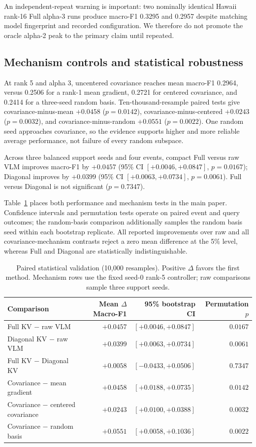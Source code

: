 \documentclass[conference]{IEEEtran}
\begin{document}
An independent-repeat warning is important: two nominally identical Hawaii
rank-16 Full alpha-3 runs produce macro-F1 0.3295 and 0.2957 despite matching
model fingerprint and recorded configuration. We therefore do not promote the
oracle alpha-2 peak to the primary claim until repeated.

\subsection{Mechanism controls and statistical robustness}
At rank 5 and alpha 3, uncentered covariance reaches mean macro-F1 0.2964,
versus 0.2506 for a rank-1 mean gradient, 0.2721 for centered covariance, and
0.2414 for a three-seed random basis. Ten-thousand-resample paired tests give
covariance-minus-mean $+0.0458$ ($p=0.0142$), covariance-minus-centered
$+0.0243$ ($p=0.0032$), and covariance-minus-random $+0.0551$ ($p=0.0022$).
One random seed approaches covariance, so the evidence supports higher and
more reliable average performance, not failure of every random subspace.

Across three balanced support seeds and four events, compact Full versus raw
VLM improves macro-F1 by $+0.0457$ (95\% CI $[+0.0046,+0.0847]$,
$p=0.0167$); Diagonal improves by $+0.0399$ (95\% CI
$[+0.0063,+0.0734]$, $p=0.0061$). Full versus Diagonal is not significant
($p=0.7347$).

Table~\ref{tab:significance} places both performance and mechanism tests in the
main paper. Confidence intervals and permutation tests operate on paired event
and query outcomes; the random-basis comparison additionally samples the random
basis seed within each bootstrap replicate. All reported improvements over raw
and all covariance-mechanism contrasts reject a zero mean difference at the
5\% level, whereas Full and Diagonal are statistically indistinguishable.

\begin{table}[t]
\centering\small
\caption{Paired statistical validation (10,000 resamples). Positive $\Delta$
favors the first method. Mechanism rows use the fixed seed-0 rank-5 controller;
raw comparisons sample three support seeds.}
\label{tab:significance}
\begin{tabular}{lrrr}
\toprule
Comparison & Mean $\Delta$ Macro-F1 & 95\% bootstrap CI & Permutation $p$\\
\midrule
Full KV $-$ raw VLM & $+0.0457$ & $[+0.0046,+0.0847]$ & $0.0167$\\
Diagonal KV $-$ raw VLM & $+0.0399$ & $[+0.0063,+0.0734]$ & $0.0061$\\
Full KV $-$ Diagonal KV & $+0.0058$ & $[-0.0433,+0.0506]$ & $0.7347$\\
Covariance $-$ mean gradient & $+0.0458$ & $[+0.0188,+0.0735]$ & $0.0142$\\
Covariance $-$ centered covariance & $+0.0243$ & $[+0.0100,+0.0388]$ & $0.0032$\\
Covariance $-$ random basis & $+0.0551$ & $[+0.0058,+0.1036]$ & $0.0022$\\
\bottomrule
\end{tabular}
\end{table}
\end{document}
